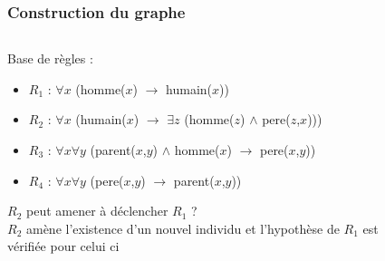 \begin{frame}
	\frametitle{Construction du graphe}
	\begin{columns}
	\begin{column}{0.55\linewidth}
		Base de règles :
		\begin{itemize}
			\item $R_1$ : $\forall x$ (homme($x$) $\rightarrow$ humain($x$))
			\item $R_2$ : $\forall x$ (humain($x$) $\rightarrow$ $\exists z$ (homme($z$)
			$\wedge$ pere($z$,$x$)))
			\item $R_3$ : $\forall x \forall y$ (parent($x$,$y$) $\wedge$ homme($x$)
			$\rightarrow$ pere($x$,$y$))
			\item $R_4$ : $\forall x \forall y$ (pere($x$,$y$) $\rightarrow$
			parent($x$,$y$))
		\end{itemize}
		\vfill
		$R_2$ peut amener à déclencher $R_1$ ?\\
		$R_2$ amène l'existence d'un nouvel individu et	
		l'hypothèse de $R_1$ est vérifiée pour celui ci
	\end{column}
	\vline
	\hfill
	\begin{column}{0.35\linewidth}
		\begin{figure}
		\end{figure}
	\end{column}
	\end{columns}
\end{frame}



